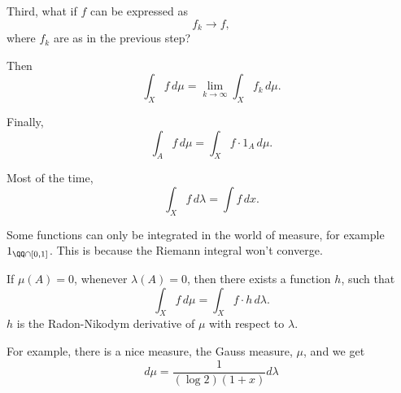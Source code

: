 \documentclass{article}
\begin{document}
Third, what if $f$ can be expressed as 
\[ f_k \to f,\]
where $f_k$ are as in the previous step?

Then 
\[ \int_X f\,d\mu = \lim_{k\to\infty} \int_X f_k\,d\mu. \]

Finally,
\[ \int_A f\,d\mu = \int_X f\cdot 1_A \, d\mu.\]

\begin{remark}
    Most of the time, 
    \[ \int_X f\,d\lambda = \int f\, dx. \]

    Some functions can only be integrated in the world of measure,
    for example $1_{\QQ\cap [0,1]}$. This is because the Riemann
    integral won't converge.

    If $\mu(A)=0$, whenever $\lambda(A)=0$, then there exists 
    a function $h$, such that 
    \[\int_Xf\,d\mu = \int_X f\cdot h \, d\lambda. \]
    $h$ is the Radon-Nikodym derivative of $\mu$ with respect
    to $\lambda$.
\end{remark}

For example, there is a nice measure, the Gauss measure, $\mu$, and we get 
\[d\mu = \frac{1}{(\log 2) (1+x)} d\lambda\]
\end{document}
